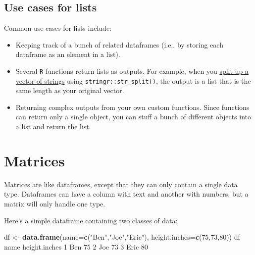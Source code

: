 \documentclass[
]{book}
\newenvironment{Shaded}{\begin{snugshade}}{\end{snugshade}}
\newcommand{\DataTypeTok}[1]{\textcolor[rgb]{0.13,0.29,0.53}{#1}}
\newcommand{\DecValTok}[1]{\textcolor[rgb]{0.00,0.00,0.81}{#1}}
\newcommand{\KeywordTok}[1]{\textcolor[rgb]{0.13,0.29,0.53}{\textbf{#1}}}
\newcommand{\NormalTok}[1]{#1}
\newcommand{\StringTok}[1]{\textcolor[rgb]{0.31,0.60,0.02}{#1}}
\begin{document}
\hypertarget{use-cases-for-lists}{%
\subsection*{Use cases for lists}\label{use-cases-for-lists}}

Common use cases for lists include:

\begin{itemize}
\item
  Keeping track of a bunch of related dataframes (i.e., by storing each dataframe as an element in a list).
\item
  Several \texttt{R} functions return lists as outputs. For example, when you \protect\hyperlink{text}{split up a vector of strings} using \texttt{stringr::str\_split()}, the output is a list that is the same length as your original vector.
\item
  Returning complex outputs from your own custom functions. Since functions can return only a single object, you can stuff a bunch of different objects into a list and return the list.
\end{itemize}

\hypertarget{matrices}{%
\section*{Matrices}\label{matrices}}

Matrices are like dataframes, except that they can only contain a single data type. Dataframes can have a column with text and another with numbers, but a matrix will only handle one type.

Here's a simple dataframe containing two classes of data:

\begin{Shaded}
\begin{Highlighting}[]
\NormalTok{df <-}\StringTok{ }\KeywordTok{data.frame}\NormalTok{(}\DataTypeTok{name=}\KeywordTok{c}\NormalTok{(}\StringTok{"Ben"}\NormalTok{,}\StringTok{"Joe"}\NormalTok{,}\StringTok{"Eric"}\NormalTok{),}
                 \DataTypeTok{height.inches=}\KeywordTok{c}\NormalTok{(}\DecValTok{75}\NormalTok{,}\DecValTok{73}\NormalTok{,}\DecValTok{80}\NormalTok{))}
\NormalTok{df}
\NormalTok{  name height.inches}
\DecValTok{1}\NormalTok{  Ben            }\DecValTok{75}
\DecValTok{2}\NormalTok{  Joe            }\DecValTok{73}
\DecValTok{3}\NormalTok{ Eric            }\DecValTok{80}
\end{Highlighting}
\end{Shaded}
\end{document}
